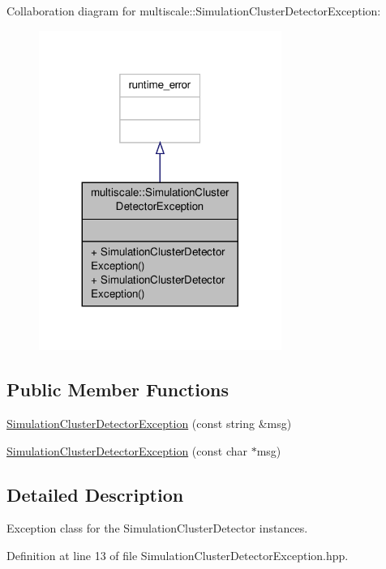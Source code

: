 Collaboration diagram for multiscale\-:\-:Simulation\-Cluster\-Detector\-Exception\-:\nopagebreak
\begin{figure}[H]
\begin{center}
\leavevmode
\includegraphics[width=224pt]{classmultiscale_1_1SimulationClusterDetectorException__coll__graph}
\end{center}
\end{figure}
\subsection*{Public Member Functions}
\begin{DoxyCompactItemize}
\item 
\hyperlink{classmultiscale_1_1SimulationClusterDetectorException_a312778e6b39dbb9628bd1c1af4fc6d54}{Simulation\-Cluster\-Detector\-Exception} (const string \&msg)
\item 
\hyperlink{classmultiscale_1_1SimulationClusterDetectorException_a9f15767b07c46b7f41f2a6a75047da7b}{Simulation\-Cluster\-Detector\-Exception} (const char $\ast$msg)
\end{DoxyCompactItemize}


\subsection{Detailed Description}
Exception class for the Simulation\-Cluster\-Detector instances. 

Definition at line 13 of file Simulation\-Cluster\-Detector\-Exception.\-hpp.



